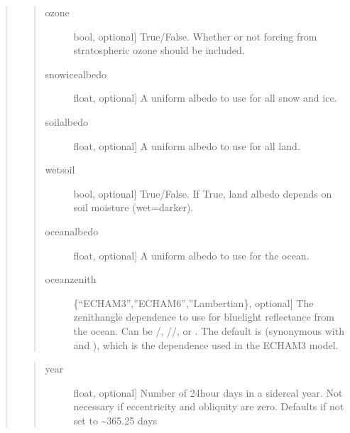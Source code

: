 \documentclass[letterpaper,10pt,english]{sphinxmanual}
\begin{document}
\begin{fulllineitems}
\begin{fulllineitems}
\begin{quote}
\begin{quote}
\begin{description}
\item[{ozone}] \leavevmode{[}bool, optional{]}
True/False. Whether or not forcing from stratospheric ozone should be included.

\item[{snowicealbedo}] \leavevmode{[}float, optional{]}
A uniform albedo to use for all snow and ice.

\item[{soilalbedo}] \leavevmode{[}float, optional{]}
A uniform albedo to use for all land.

\item[{wetsoil}] \leavevmode{[}bool, optional{]}
True/False. If True, land albedo depends on soil moisture (wet=darker).

\item[{oceanalbedo}] \leavevmode{[}float, optional{]}
A uniform albedo to use for the ocean.

\item[{oceanzenith}] \leavevmode{[}\{“ECHAM\sphinxhyphen{}3”,”ECHAM\sphinxhyphen{}6”,”Lambertian\}, optional{]}
The zenith\sphinxhyphen{}angle dependence to use for blue\sphinxhyphen{}light reflectance from the ocean.
Can be /, //, or .
The default is  (synonymous with  and ), which is
the dependence used in the ECHAM\sphinxhyphen{}3 model.

\end{description}
\end{quote}

\begin{quote}
\begin{description}
\item[{year}] \leavevmode{[}float, optional{]}
Number of 24\sphinxhyphen{}hour days in a sidereal year. Not necessary if eccentricity and
obliquity are zero. Defaults if not set to \textasciitilde{}365.25 days


\end{description}
\end{quote}
\end{quote}
\end{fulllineitems}
\end{fulllineitems}
\end{document}

